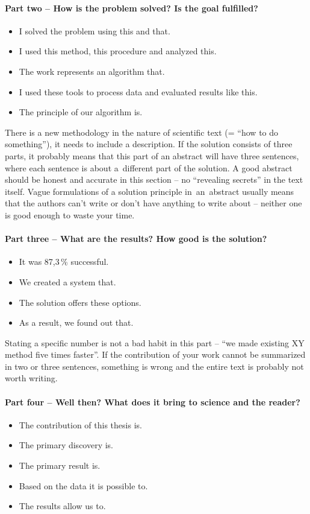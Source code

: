 \paragraph{Part two -- How is the problem solved? Is the goal fulfilled?}
\begin{itemize}
  \item{I solved the problem using this and that.}
  \item{I used this method, this procedure and analyzed this.}
  \item{The work represents an algorithm that.}
  \item{I used these tools to process data and evaluated results like this.}
  \item{The principle of our algorithm is.}
\end{itemize}

There is a new methodology in the nature of scientific text (= ``how to do something''), it needs to include a description. If the solution consists of three parts, it probably means that this part of an abstract will have three sentences, where each sentence is about a~different part of the solution. A good abstract should be honest and accurate in this section -- no ``revealing secrets'' in the text itself. Vague formulations of a solution principle in~an~abstract usually means that the authors can't write or don't have anything to write about -- neither one is good enough to waste your time.

\paragraph{Part three -- What are the results? How good is the solution?}
\begin{itemize}
  \item{It was 87,3\,\% successful.}
  \item{We created a system that.}
  \item{The solution offers these options.}
  \item{As a result, we found out that.}
\end{itemize}

Stating a specific number is not a bad habit in this part -- ``we made existing XY method five times faster''. If the contribution of your work cannot be summarized in two or three sentences, something is wrong and the entire text is probably not worth writing.

\paragraph{Part four -- Well then? What does it bring to science and the reader?}
\begin{itemize}
  \item{The contribution of this thesis is.}
  \item{The primary discovery is.}
  \item{The primary result is.}
  \item{Based on the data it is possible to.}
  \item{The results allow us to.}
\end{itemize}

